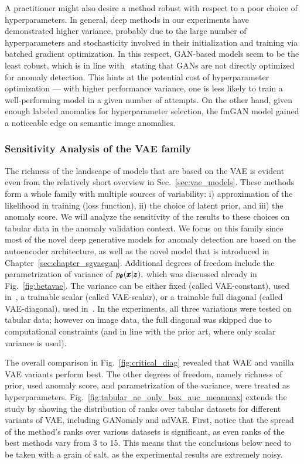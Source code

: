 A practitioner might also desire a method robust with respect to a poor choice of hyperparameters.  In general, deep methods in our experiments have demonstrated higher variance, probably due to the large number of hyperparameters and stochasticity involved in their initialization and training via batched gradient optimization. In this respect, GAN-based models seem to be the least robust, which is in line with~\cite{deecke2018image} stating that GANs are not directly optimized for anomaly detection. This hints at the potential cost of hyperparameter optimization --- with higher performance variance, one is less likely to train a well-performing model in a given number of attempts. On the other hand, given enough labeled anomalies for hyperparameter selection, the fmGAN model gained a noticeable edge on semantic image anomalies. 

\subsubsection{Sensitivity Analysis of the VAE family}
\label{sec:vae_results}
The richness of the landscape of models that are based on the VAE is evident even from the relatively short overview in Sec.~\ref{sec:vae_models}. These methods form a whole family with multiple sources of variability: i) approximation of the likelihood in training (loss function), ii) the choice of latent prior, and iii) the anomaly score. We will analyze the sensitivity of the results to these choices on tabular data in the anomaly validation context. We focus on this family since most of the novel deep generative models for anomaly detection are based on the autoencoder architecture, as well as the novel model that is introduced in Chapter~\ref{sec:chapter_sgvaegan}. Additional degrees of freedom include the parametrization of variance of $p_{\pmb{{\theta}}}(\pmb{{x}}|\pmb{{z}}),$ which was discussed already in Fig.~\ref{fig:betavae}. The variance can be either fixed (called VAE-constant), used in~\cite{yaoUnsupervisedAnomalyDetection2019, wang2020advae, ahnDeepGenerativeModelsBased2020}, a trainable scalar (called VAE-scalar), or a trainable full diagonal (called VAE-diagonal), used in~\cite{an2015variational,xu2018unsupervised, zenatiEfficientGANBasedAnomaly2018}. In the experiments, all three variations were tested on tabular data; however on image data, the full diagonal was skipped due to computational constraints (and in line with the prior art, where only scalar variance is used).

The overall comparison in Fig.~\ref{fig:critical_diag} revealed that WAE and vanilla VAE variants perform best. The other degrees of freedom, namely richness of prior, used anomaly score, and parametrization of the variance, were treated as hyperparameters. Fig.~\ref{fig:tabular_ae_only_box_auc_meanmax} extends the study by showing the distribution of ranks over tabular datasets for different variants of VAE, including GANomaly and adVAE. First, notice that the spread of the method's ranks over various datasets is significant, as even ranks of the best methods vary from 3 to 15. This means that the conclusions below need to be taken with a grain of salt, as the experimental results are extremely noisy.

